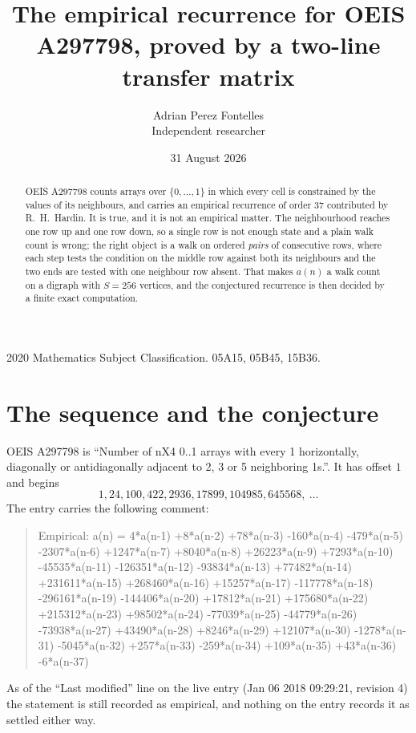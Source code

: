 \documentclass[11pt,a4paper]{article}
\title{The empirical recurrence for OEIS A297798, proved by a two-line transfer matrix}
\author{Adrian Perez Fontelles\\ \small Independent researcher}
\date{31 August 2026}
\theoremstyle{plain}
\theoremstyle{definition}
\begin{document}
\maketitle

\begin{abstract}
OEIS A297798 counts arrays over $\{0,\dots,1\}$ in which every cell is constrained by the
values of its neighbours, and carries an empirical recurrence of order $37$ contributed
by R.~H.~Hardin. It is true, and it is not an empirical matter. The neighbourhood reaches one
row up and one row down, so a single row is not enough state and a plain walk count
is wrong; the right object is a walk on ordered \emph{pairs} of consecutive rows, where
each step tests the condition on the middle row against both its neighbours and the two
ends are tested with one neighbour row absent. That makes $a(n)$ a walk count on a digraph
with $S=256$ vertices, and the conjectured recurrence is then decided by a finite exact
computation.
\end{abstract}

\noindent\small 2020 Mathematics Subject Classification. 05A15, 05B45, 15B36.\normalsize

\section{The sequence and the conjecture}

OEIS A297798 is ``Number of nX4 0..1 arrays with every 1 horizontally, diagonally or antidiagonally adjacent to 2, 3 or 5 neighboring 1s.''. It has offset $1$ and begins
\[
1, 24, 100, 422, 2936, 17899, 104985, 645568,\ \dots
\]
The entry carries the following comment:
\begin{quote}\small
Empirical: a(n) = 4*a(n-1) +8*a(n-2) +78*a(n-3) -160*a(n-4) -479*a(n-5) -2307*a(n-6) +1247*a(n-7) +8040*a(n-8) +26223*a(n-9) +7293*a(n-10) -45535*a(n-11) -126351*a(n-12) -93834*a(n-13) +77482*a(n-14) +231611*a(n-15) +268460*a(n-16) +15257*a(n-17) -117778*a(n-18) -296161*a(n-19) -144406*a(n-20) +17812*a(n-21) +175680*a(n-22) +215312*a(n-23) +98502*a(n-24) -77039*a(n-25) -44779*a(n-26) -73938*a(n-27) +43490*a(n-28) +8246*a(n-29) +12107*a(n-30) -1278*a(n-31) -5045*a(n-32) +257*a(n-33) -259*a(n-34) +109*a(n-35) +43*a(n-36) -6*a(n-37)
\end{quote}
As of the ``Last modified'' line on the live entry (Jan 06 2018 09:29:21, revision 4) the statement is
still recorded as empirical, and nothing on the entry records it as settled either way.
\end{document}
